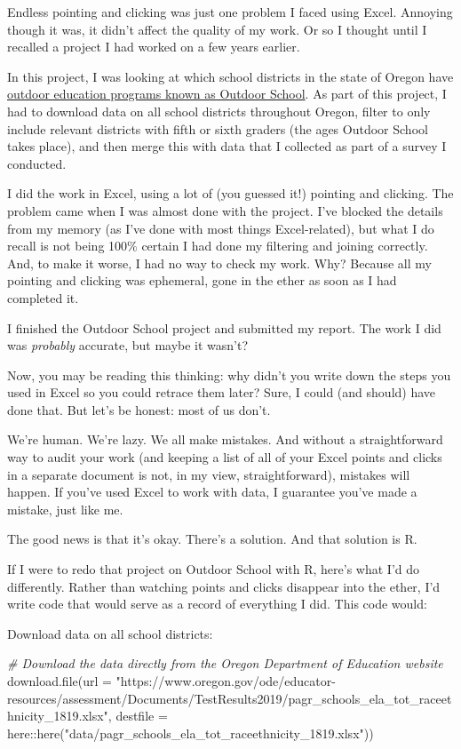 \documentclass[
]{book}
\newenvironment{Shaded}{\begin{snugshade}}{\end{snugshade}}
\newcommand{\AttributeTok}[1]{\textcolor[rgb]{0.77,0.63,0.00}{#1}}
\newcommand{\CommentTok}[1]{\textcolor[rgb]{0.56,0.35,0.01}{\textit{#1}}}
\newcommand{\FunctionTok}[1]{\textcolor[rgb]{0.00,0.00,0.00}{#1}}
\newcommand{\NormalTok}[1]{#1}
\newcommand{\SpecialCharTok}[1]{\textcolor[rgb]{0.00,0.00,0.00}{#1}}
\newcommand{\StringTok}[1]{\textcolor[rgb]{0.31,0.60,0.02}{#1}}
\begin{document}
Endless pointing and clicking was just one problem I faced using Excel. Annoying though it was, it didn't affect the quality of my work. Or so I thought until I recalled a project I had worked on a few years earlier.

In this project, I was looking at which school districts in the state of Oregon have \href{https://oregonstate.app.box.com/s/83g5sjdm88xgqdxfze0ri7qo4uff5sj7}{outdoor education programs known as Outdoor School}. As part of this project, I had to download data on all school districts throughout Oregon, filter to only include relevant districts with fifth or sixth graders (the ages Outdoor School takes place), and then merge this with data that I collected as part of a survey I conducted.

I did the work in Excel, using a lot of (you guessed it!) pointing and clicking. The problem came when I was almost done with the project. I've blocked the details from my memory (as I've done with most things Excel-related), but what I do recall is not being 100\% certain I had done my filtering and joining correctly. And, to make it worse, I had no way to check my work. Why? Because all my pointing and clicking was ephemeral, gone in the ether as soon as I had completed it.

I finished the Outdoor School project and submitted my report. The work I did was \emph{probably} accurate, but maybe it wasn't?

Now, you may be reading this thinking: why didn't you write down the steps you used in Excel so you could retrace them later? Sure, I could (and should) have done that. But let's be honest: most of us don't.

We're human. We're lazy. We all make mistakes. And without a straightforward way to audit your work (and keeping a list of all of your Excel points and clicks in a separate document is not, in my view, straightforward), mistakes will happen. If you've used Excel to work with data, I guarantee you've made a mistake, just like me.

The good news is that it's okay. There's a solution. And that solution is R.

If I were to redo that project on Outdoor School with R, here's what I'd do differently. Rather than watching points and clicks disappear into the ether, I'd write code that would serve as a record of everything I did. This code would:

Download data on all school districts:

\begin{Shaded}
\begin{Highlighting}[]
\CommentTok{\# Download the data directly from the Oregon Department of Education website}
\FunctionTok{download.file}\NormalTok{(}\AttributeTok{url =} \StringTok{"https://www.oregon.gov/ode/educator{-}resources/assessment/Documents/TestResults2019/pagr\_schools\_ela\_tot\_raceethnicity\_1819.xlsx"}\NormalTok{,}
              \AttributeTok{destfile =}\NormalTok{ here}\SpecialCharTok{::}\FunctionTok{here}\NormalTok{(}\StringTok{"data/pagr\_schools\_ela\_tot\_raceethnicity\_1819.xlsx"}\NormalTok{))}
\end{Highlighting}
\end{Shaded}
\end{document}
